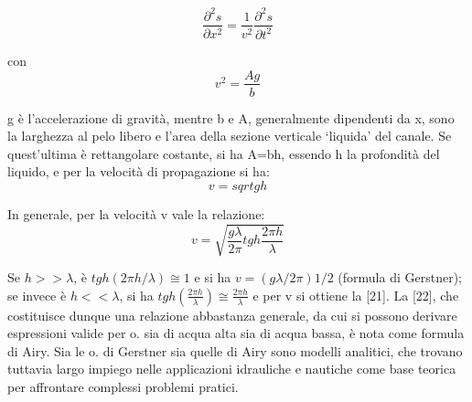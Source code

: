 \documentclass[a4paper]{article}
\begin{document}
\begin{equation}
\frac{\partial^2 s}{\partial x^2}=\frac{1}{v^2}\frac{\partial^2 s}{\partial t^2}
\end{equation}

con
\begin{equation}
v^2=\frac{Ag}{b}
\end{equation}

g è l'accelerazione di gravità, mentre b e A, generalmente dipendenti da x, sono la larghezza al pelo libero e l'area della sezione verticale ‘liquida' del canale. Se quest'ultima è rettangolare costante, si ha A=bh, essendo h la profondità del liquido, e per la velocità di propagazione si ha: 
\begin{equation}
v=sqrt{gh}
\end{equation}

In generale, per la velocità v vale la relazione: 
\begin{equation}
v=\sqrt{\frac{g\lambda}{2\pi} tgh \frac{2\pi h}{\lambda}}
\end{equation}

Se $h>>\lambda$, è $tgh(2\pi h/\lambda)\cong 1$ e si ha $v=(g\lambda/2\pi )1/2$ (formula di Gerstner); se invece è $h<<\lambda$, si ha $tgh(\frac{2\pi h}{\lambda})\cong \frac{2\pi h}{\lambda}$ e per v si ottiene la [21]. La [22], che costituisce dunque una relazione abbastanza generale, da cui si possono derivare espressioni valide per o. sia di acqua alta sia di acqua bassa, è nota come formula di Airy. Sia le o. di Gerstner sia quelle di Airy sono modelli analitici, che trovano tuttavia largo impiego nelle applicazioni idrauliche e nautiche come base teorica per affrontare complessi problemi pratici. 
\end{document}
